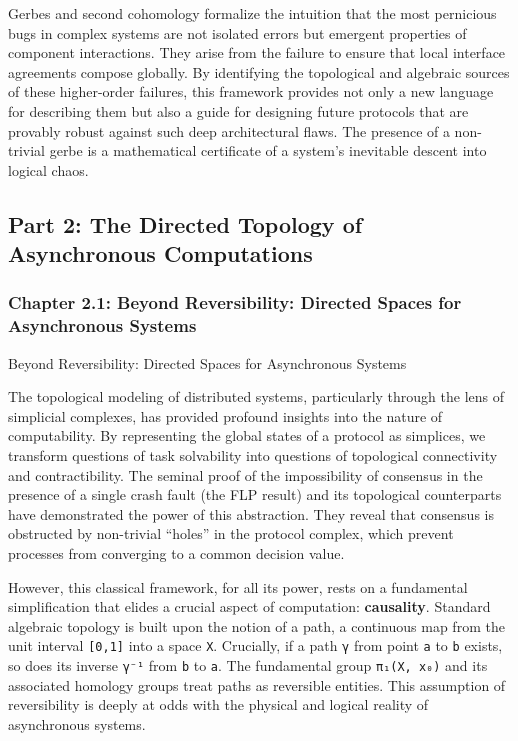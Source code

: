 \documentclass[
]{article}
\begin{document}
Gerbes and second cohomology formalize the intuition that the most
pernicious bugs in complex systems are not isolated errors but emergent
properties of component interactions. They arise from the failure to
ensure that local interface agreements compose globally. By identifying
the topological and algebraic sources of these higher-order failures,
this framework provides not only a new language for describing them but
also a guide for designing future protocols that are provably robust
against such deep architectural flaws. The presence of a non-trivial
gerbe is a mathematical certificate of a system's inevitable descent
into logical chaos.

\subsection{Part 2: The Directed Topology of Asynchronous
Computations}\label{part-2-the-directed-topology-of-asynchronous-computations}

\protect{}\label{part-2-The_Directed_Topology_of_Asynchronous_Co}{}

\subsubsection{Chapter 2.1: Beyond Reversibility: Directed Spaces for
Asynchronous
Systems}\label{chapter-2.1-beyond-reversibility-directed-spaces-for-asynchronous-systems}

\protect{}\label{chapter-2-1-Beyond_Reversibility__Directed_Spaces_fo}{}

Beyond Reversibility: Directed Spaces for Asynchronous Systems

The topological modeling of distributed systems, particularly through
the lens of simplicial complexes, has provided profound insights into
the nature of computability. By representing the global states of a
protocol as simplices, we transform questions of task solvability into
questions of topological connectivity and contractibility. The seminal
proof of the impossibility of consensus in the presence of a single
crash fault (the FLP result) and its topological counterparts have
demonstrated the power of this abstraction. They reveal that consensus
is obstructed by non-trivial ``holes'' in the protocol complex, which
prevent processes from converging to a common decision value.

However, this classical framework, for all its power, rests on a
fundamental simplification that elides a crucial aspect of computation:
\textbf{causality}. Standard algebraic topology is built upon the notion
of a path, a continuous map from the unit interval \texttt{{[}0,1{]}}
into a space \texttt{X}. Crucially, if a path \texttt{γ} from point
\texttt{a} to \texttt{b} exists, so does its inverse \texttt{γ⁻¹} from
\texttt{b} to \texttt{a}. The fundamental group \texttt{π₁(X,\ x₀)} and
its associated homology groups treat paths as reversible entities. This
assumption of reversibility is deeply at odds with the physical and
logical reality of asynchronous systems.
\end{document}
